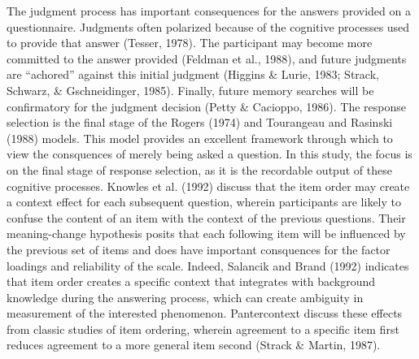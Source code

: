 \documentclass[english,man, mask]{apa6}
\theoremstyle{definition}
\theoremstyle{definition}
\theoremstyle{definition}
\theoremstyle{remark}
\begin{document}
The judgment process has important consequences for the answers provided
on a questionnaire. Judgments often polarized because of the cognitive
processes used to provide that answer (Tesser, 1978). The participant
may become more committed to the answer provided (Feldman et al., 1988),
and future judgments are \enquote{achored} against this initial judgment
(Higgins \& Lurie, 1983; Strack, Schwarz, \& Gschneidinger, 1985).
Finally, future memory searches will be confirmatory for the judgment
decision (Petty \& Cacioppo, 1986). The response selection is the final
stage of the Rogers (1974) and Tourangeau and Rasinski (1988) models.
This model provides an excellent framework through which to view the
consquences of merely being asked a question. In this study, the focus
is on the final stage of response selection, as it is the recordable
output of these cognitive processes. Knowles et al. (1992) discuss that
the item order may create a context effect for each subsequent question,
wherein participants are likely to confuse the content of an item with
the context of the previous questions. Their meaning-change hypothesis
posits that each following item will be influenced by the previous set
of items and does have important consquences for the factor loadings and
reliability of the scale. Indeed, Salancik and Brand (1992) indicates
that item order creates a specific context that integrates with
background knowledge during the answering process, which can create
ambiguity in measurement of the interested phenomenon. Pantercontext
discuss these effects from classic studies of item ordering, wherein
agreement to a specific item first reduces agreement to a more general
item second (Strack \& Martin, 1987).
\end{document}
